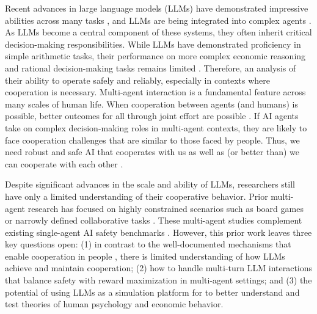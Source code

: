 \documentclass{article}
\begin{document}
Recent advances in large language models (LLMs) have demonstrated impressive abilities across many tasks \citep{achiam2023gpt, touvron2023llama, bubeck2023sparks, bengio2023managing}, and LLMs are being integrated into complex agents \citep{gao2023large,cognition2024devin}. As LLMs become a central component of these systems, they often inherit critical decision-making responsibilities. While LLMs have demonstrated proficiency in simple arithmetic tasks, their performance on more complex economic reasoning and rational decision-making tasks remains limited \citep{raman2024steer}. Therefore, an analysis of their ability to operate safely and reliably, especially in contexts where cooperation is necessary. Multi-agent interaction is a fundamental feature across many scales of human life. When cooperation between agents (and humans) is possible, better outcomes for all through joint effort are possible \citep{hardin1968tragedy,rand2013human, kleiman2016coordinate,kleiman2017learning}. If AI agents take on complex decision-making roles in multi-agent contexts, they are likely to face cooperation challenges that are similar to those faced by people. Thus, we need robust and safe AI that cooperates with us as well as (or better than) we can cooperate with each other \citep{dafoe2021cooperative}.

Despite significant advances in the scale and ability of LLMs, researchers still have only a limited understanding of their cooperative behavior. Prior multi-agent research has focused on highly constrained scenarios such as board games or narrowly defined collaborative tasks \citep{li2023camel,light2023avalonbench,xu2023exploring,duan2024gtbench, serrino2019finding}. These multi-agent studies complement existing single-agent AI safety benchmarks \citep{pan2023machiavelli,kinniment2023evaluating}. However, this prior work leaves three key questions open: (1) 
in contrast to the well-documented mechanisms that enable cooperation in people \citep{ostrom1990governing, ellickson1991order, ostrom1999revisiting}, there is limited understanding of how LLMs achieve and maintain cooperation;  %
(2) how to handle multi-turn LLM interactions that balance safety with reward maximization in multi-agent settings; and (3) the potential of using LLMs as a simulation platform for to better understand and test theories of human psychology and economic behavior.
\end{document}
